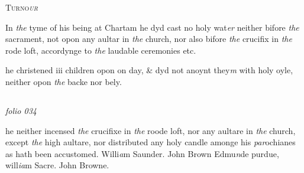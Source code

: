 \documentclass[12pt, a4paper]{book}
\begin{document}
            
            	
				\begin{center} \begin{large} {\scshape Turno\textit{ur}
               } \end{large} \end{center}
			
	
		
			
		
		\ifthenelse{\isodd{\thepage}}
		{\reversemarginpar}
		{\normalmarginpar}
		In \textit{the} tyme of his being at Chartam he dyd cast no holy
 wat\textit{er} neither bifore \textit{the} sacrament, not opon any aultar
 in \textit{the} church, nor also bifore \textit{the} crucifix in \textit{the} rode loft,
 accordynge to \textit{the} laudable ceremonies etc.
            	
				\marginpar[\vspace{0.5cm}{\textcolor{Gray}{holy oyle}}]{}
			
		\ifthenelse{\isodd{\thepage}}
		{\reversemarginpar}
		{\normalmarginpar}
		he christened iii children opon on day, \& dyd not anoynt
 they\textit{m} with holy oyle, neither opon \textit{the} backe nor bely.


\dotfill
						\newpage {} \subsection*{}  \subsection*{}  \subsection*{}

\textit{folio 034}



 
				\marginpar[\vspace{0.5cm}{\textcolor{Gray}{ceremonies}}]{}
			
		\ifthenelse{\isodd{\thepage}}
		{\reversemarginpar}
		{\normalmarginpar}
		he neither incensed \textit{the} crucifixe in \textit{the} roode loft, nor
 any aultare in \textit{the} church, except \textit{the} high aultare, nor
 distributed any holy candle amonge his\textit{ par}ochianes as
 	hath been accustomed. Willi\textit{a}m Saunder. John Brown
 	Edmu\textit{n}de purdue, will\textit{ia}m Sacre. John Browne.
 
\end{document}
